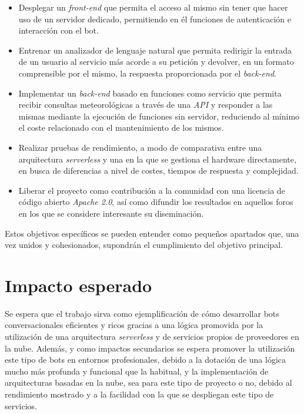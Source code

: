 \documentclass[11pt,spanish,listoffigures]{tfgetsinf}
\begin{document}
\begin{itemize}
\item Desplegar un \textit{front-end}  que permita el acceso al mismo sin tener que hacer uso de un servidor dedicado, permitiendo en él funciones de autenticación e interacción con el bot.
\item Entrenar un analizador de lenguaje natural que permita redirigir la entrada de un usuario al servicio más acorde a su petición y devolver, en un formato comprensible por el mismo, la respuesta proporcionada por el \textit{back-end}.
\item Implementar un \textit{back-end} basado en funciones como servicio que permita recibir consultas meteorológicas a través de una \textit{\gls{API}} y responder a las mismas mediante la ejecución de funciones sin servidor, reduciendo al mínimo el coste relacionado con el mantenimiento de los mismos.
\item Realizar pruebas de rendimiento, a modo de comparativa entre una arquitectura \textit{serverless} y una en la que se gestiona el hardware directamente, en busca de diferencias a nivel de costes, tiempos de respuesta y complejidad.
\item Liberar el proyecto como contribución a la comunidad con una licencia de código abierto \textit{Apache 2.0}, así como difundir los resultados en aquellos foros en los que se considere interesante su diseminación.
\end{itemize}

Estos objetivos específicos se pueden entender como pequeños apartados que, una vez unidos y cohesionados, supondrán el cumplimiento del objetivo principal.



\section{Impacto esperado}
\label{sec:impacto}

Se espera que el trabajo sirva como ejemplificación de cómo desarrollar bots conversacionales eficientes y ricos gracias a una lógica promovida por la utilización de una arquitectura \textit{serverless} y de servicios propios de proveedores en la nube. Además, y como impactos secundarios se espera promover la utilización este tipo de bots en entornos profesionales, debido a la dotación de una lógica mucho más profunda y funcional que la habitual, y la implementación de arquitecturas basadas en la nube, sea para este tipo de proyecto o no, debido al rendimiento mostrado y a la facilidad con la que se despliegan este tipo de servicios.
\end{document}

